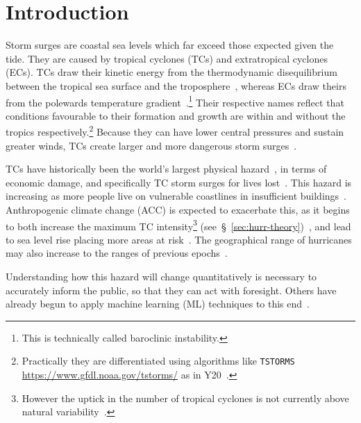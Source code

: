 \section{Introduction}
\label{sec:1_Introduction}


Storm surges are coastal sea levels which far exceed those
expected given the tide.
They are caused by tropical cyclones
(TCs) and extratropical cyclones (ECs).
TCs draw their kinetic energy from the thermodynamic disequilibrium between
the tropical sea surface and the troposphere~\cite{emanuel1986air, emanuel1987dependence},
whereas ECs draw theirs from the
polewards temperature gradient~\cite{lorenz1960energy, holton2004introduction}.\footnote{This is technically called baroclinic instability.}
Their respective names reflect that conditions favourable
to their formation and growth are within and without the tropics respectively.\footnote{
Practically they are differentiated using algorithms like \texttt{TSTORMS}
\url{https://www.gfdl.noaa.gov/tstorms/} as in Y20~\cite{ZannaPreprint}.}
Because they can have lower central pressures and sustain greater winds,
TCs create larger and more dangerous storm surges~\cite{emanuel2005divine}.

TCs have historically been the
world's largest physical hazard~\cite{shultz2005epidemiology},
in terms of economic damage, and specifically TC storm surges for lives lost~\cite{shultz2005epidemiology, zhang2009tropical, emanuel2005divine}.
This hazard is increasing as more people live on vulnerable coastlines
in insufficient buildings~\cite{emanuel2005divine}.
Anthropogenic climate change (ACC) is expected to exacerbate this,
as it begins to both increase the maximum TC intensity\footnote{However the uptick
in the number of tropical cyclones is not currently above
 natural variability~\cite{mendelsohn2012impact}.}
(see~§~\ref{sec:hurr-theory})~\cite{emanuel2008hurricanes,emanuel2017will},
and lead to sea level rise placing more areas at risk~\cite{SROCC}.
The geographical range of hurricanes may also increase
to the ranges of previous epochs~\cite{fedorov2010tropical}.

Understanding how this hazard will change quantitatively
is necessary to accurately
inform the public,
so that they can act with foresight.
Others have already begun to apply machine learning (ML) techniques to this
end~\cite{kulp2019new, kulp2018coastaldem, tadesse2020data}.




